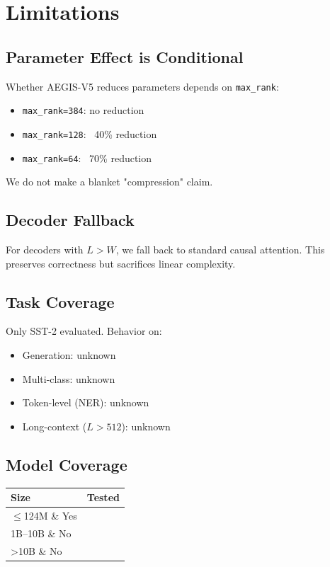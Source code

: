 \section{Limitations}

\subsection{Parameter Effect is Conditional}

Whether AEGIS-V5 reduces parameters depends on \texttt{max\_rank}:

\begin{itemize}
\item \texttt{max\_rank=384}: no reduction
\item \texttt{max\_rank=128}: ~40\% reduction
\item \texttt{max\_rank=64}: ~70\% reduction

\end{itemize}
We do not make a blanket "compression" claim.

\subsection{Decoder Fallback}

For decoders with $L > W$, we fall back to standard causal attention. This 
preserves correctness but sacrifices linear complexity.

\subsection{Task Coverage}

Only SST-2 evaluated. Behavior on:
\begin{itemize}
\item Generation: unknown
\item Multi-class: unknown
\item Token-level (NER): unknown
\item Long-context ($L > 512$): unknown

\end{itemize}
\subsection{Model Coverage}

\begin{table}[H]
\centering
\small
\begin{tabular}{ll}
\toprule
\textbf{Size} & \textbf{Tested} \\
\midrule
$\le$124M \& Yes \\
1B--10B \& No \\
\textgreater{}10B \& No \\
\bottomrule
\end{tabular}
\end{table}

